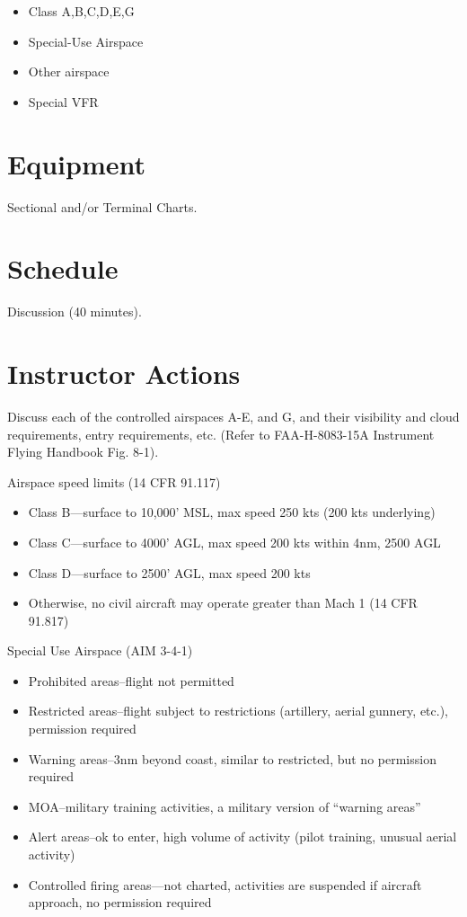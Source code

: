 \documentclass[twoside,openright]{report}
\begin{document}
\begin{itemize}
  \item Class A,B,C,D,E,G
  \item Special-Use Airspace
  \item Other airspace
  \item Special VFR
\end{itemize}

\section{Equipment}

Sectional and/or Terminal Charts.

\section{Schedule}

Discussion (40 minutes).

\section{Instructor Actions}

Discuss each of the controlled airspaces A-E, and G, and their visibility and
cloud requirements, entry requirements, etc. (Refer to FAA-H-8083-15A
Instrument Flying Handbook Fig. 8-1).

Airspace speed limits (14 CFR 91.117)
\begin{itemize}
  \item Class B—surface to 10,000' MSL, max speed 250 kts (200 kts underlying)
  \item Class C—surface to 4000' AGL, max speed 200 kts within 4nm, 2500 AGL
  \item Class D—surface to 2500' AGL, max speed 200 kts
  \item Otherwise, no civil aircraft may operate greater than Mach 1 (14 CFR 91.817)
\end{itemize}

Special Use Airspace (AIM 3-4-1)
\begin{itemize}
  \item Prohibited areas--flight not permitted
  \item Restricted areas--flight subject to restrictions (artillery, aerial
    gunnery, etc.), permission required
  \item Warning areas--3nm beyond coast, similar to restricted, but no
    permission required
  \item MOA--military training activities, a military version of ``warning
    areas''
  \item Alert areas--ok to enter, high volume of activity (pilot training,
    unusual aerial activity)
  \item Controlled firing areas—not charted, activities are suspended if
    aircraft approach, no permission required
\end{itemize}
\end{document}
